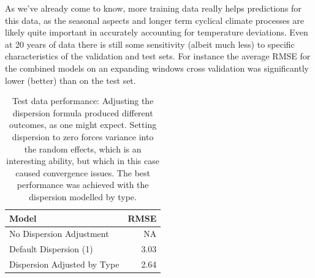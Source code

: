 \documentclass[12pt, twoside,hidelinks]{article}
\theoremstyle{definition}
\numberwithin{equation}{section}
\begin{document}
As we've already come to know, more training data really helps predictions for this data, as the seasonal aspects and longer term cyclical climate processes are likely quite important in accurately accounting for temperature deviations. Even at 20 years of data there is still some sensitivity (albeit much less) to specific characteristics of the validation and test sets. For instance the average RMSE for the combined models on an expanding windows cross validation was significantly lower (better) than on the test set.

\begin{table}[H]
\centering
\begin{tabular}{lr}
\hline
Model & RMSE \\
\hline
No Dispersion Adjustment & NA \\
Default Dispersion (1) & 3.03 \\
Dispersion Adjusted by Type & 2.64 \\
\hline
\end{tabular}
\caption{Test data performance: Adjusting the dispersion formula produced different outcomes, as one might expect. Setting dispersion to zero forces variance into the random effects, which is an interesting ability, but which in this case caused convergence issues. The best performance was achieved with the dispersion modelled by type.}
\label{table:performance_metrics}
\end{table}
\end{document}
